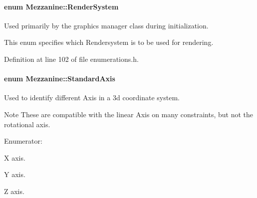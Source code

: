 \hypertarget{namespaceMezzanine_a1bb0347c37954bc71c4344e4b55c729a}{
\paragraph[{RenderSystem}]{\setlength{\rightskip}{0pt plus 5cm}enum {\bf Mezzanine::RenderSystem}}\hfill}
\label{namespaceMezzanine_a1bb0347c37954bc71c4344e4b55c729a}


Used primarily by the graphics manager class during initialization. 

This enum specifies which Rendersystem is to be used for rendering. 

Definition at line 102 of file enumerations.h.

\hypertarget{namespaceMezzanine_ab41a00a8c6a47b576dc987ec34e16ba1}{
\paragraph[{StandardAxis}]{\setlength{\rightskip}{0pt plus 5cm}enum {\bf Mezzanine::StandardAxis}}\hfill}
\label{namespaceMezzanine_ab41a00a8c6a47b576dc987ec34e16ba1}


Used to identify different Axis in a 3d coordinate system. 

\begin{DoxyNote}{Note}
These are compatible with the linear Axis on many constraints, but not the rotational axis. 
\end{DoxyNote}
\begin{Desc}
\item[Enumerator: ]\par
\begin{description}
\item[{\em 
\hypertarget{namespaceMezzanine_ab41a00a8c6a47b576dc987ec34e16ba1a823c8f182393aef96f017c7279d49126}{
Axis\_\-X}
\label{namespaceMezzanine_ab41a00a8c6a47b576dc987ec34e16ba1a823c8f182393aef96f017c7279d49126}
}]X axis. \item[{\em 
\hypertarget{namespaceMezzanine_ab41a00a8c6a47b576dc987ec34e16ba1a935c7afe0104697553cf85e9214fb3fb}{
Axis\_\-Y}
\label{namespaceMezzanine_ab41a00a8c6a47b576dc987ec34e16ba1a935c7afe0104697553cf85e9214fb3fb}
}]Y axis. \item[{\em 
\hypertarget{namespaceMezzanine_ab41a00a8c6a47b576dc987ec34e16ba1a6af6621383cc7da1fe11a86ba6de37c0}{
Axis\_\-Z}
\label{namespaceMezzanine_ab41a00a8c6a47b576dc987ec34e16ba1a6af6621383cc7da1fe11a86ba6de37c0}
}]Z axis. \end{description}
\end{Desc}



